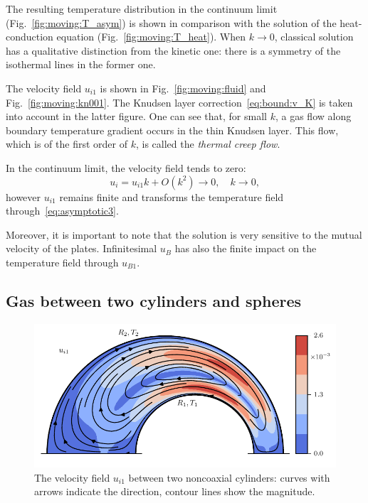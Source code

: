 \documentclass[smallextended, referee]{svjour3} %
\begin{document}
The resulting temperature distribution in the continuum limit (Fig.~\ref{fig:moving:T_asym}) is shown
in comparison with the solution of the heat-conduction equation (Fig.~\ref{fig:moving:T_heat}).
When \(k\to0\), classical solution has a qualitative distinction from the kinetic one: 
there is a symmetry of the isothermal lines in the former one.

The velocity field \(u_{i1}\) is shown in Fig.~\ref{fig:moving:fluid} and Fig.~\ref{fig:moving:kn001}.
The Knudsen layer correction~\eqref{eq:bound:v_K} is taken into account in the latter figure.
One can see that, for small \(k\), a gas flow along boundary temperature gradient occurs
in the thin Knudsen layer. This flow, which is of the first order of \(k\), is called
the \emph{thermal creep flow}.

In the continuum limit, the velocity field tends to zero:
\[ u_i = u_{i1}k + O(k^2) \to 0, \quad k\to0, \]
however \(u_{i1}\) remains finite and transforms the temperature field through~\eqref{eq:asymptotic3}.

Moreover, it is important to note that the solution is very sensitive to the mutual velocity of the plates.
Infinitesimal \(u_B\) has also the finite impact on the temperature field through \(u_{B1}\).

\subsection{Gas between two cylinders and spheres}

\begin{figure}
	\centering
	\includegraphics{Fig7}
	\caption{The velocity field \(u_{i1}\) between two noncoaxial cylinders:
		curves with arrows indicate the direction, contour lines show the magnitude.}
	\label{fig:cylinders}
\end{figure}
\end{document}
